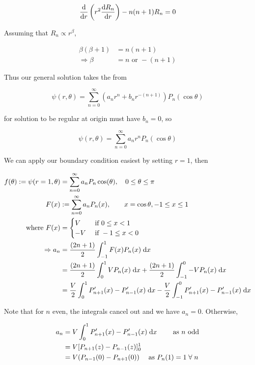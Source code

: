 \documentclass[a4paper]{article}
\begin{document}
\[ \frac{\mathrm{d} }{\mathrm{d} r} \left(  r^{2} \frac{\mathrm{d} R_{n}}{\mathrm{d} r} \right) - n(n+1) R_{n} = 0   \]

Assuming that $ R_{n} \propto r^{\beta} $,

\begin{align*}
\beta (\beta + 1) & = n(n+1) \\
\Rightarrow \beta & = n \text{ or } -(n+1) 
\end{align*}

Thus our general solution takes the from 


\[ \psi (r,\theta) =  \sum_{n=0}^{\infty} (a_{n} r^{n}  + b_{n} r^{-(n+1)}    ) P_{n} (\cos \theta)   \]


for solution to be regular at origin must have $ b_{n} = 0 $, so

\[ \psi (r,\theta) =  \sum_{n=0}^{\infty} a_{n} r^{n} P_{n} (\cos \theta)   \]

We can apply our boundary condition easiest by setting $ r=1 $, then

\begin{align*}
f(\theta) : = \psi(r=1,\theta) & = \sum_{n=0}^{\infty}  a_{n} P_{n} \cos (\theta), \quad 0 \leq \theta \leq \pi  \\
F(x) & : = \sum_{n=0}^{\infty}  a_{n} P_{n} (x), \qquad x = \cos \theta, -1 \leq x \leq 1 \\
\text{where } F(x) & = \begin{cases} V  & \text{ if } 0 \leq x < 1 \\ -V & \text{ if } -1 \leq x < 0 \end{cases} \\
\Rightarrow a_{n} & = \frac{(2n + 1)}{2} \int_{-1}^{1} F(x) P_{n}(x) \; \mathrm{d} x  \\
& = \frac{(2n + 1)}{2} \int_{0}^{1} V P_{n}(x) \; \mathrm{d} x + \frac{(2n + 1)}{2} \int_{-1}^{0} - V P_{n}(x) \; \mathrm{d} x \\
& = \frac{V}{2} \int_{0}^{1} P'_{n+1}(x) - P'_{n-1}(x) \; \mathrm{d} x - \frac{V}{2} \int_{-1}^{0}  P'_{n+1}(x) - P'_{n-1}(x) \; \mathrm{d} x
\end{align*}

Note that for $ n $ even, the integrals cancel out and we have $ a_{n} = 0 $. Otherwise, 

\begin{align*}
a_{n} & = V \int_{0}^{1}   P'_{n+1}(x) - P'_{n-1}(x) \; \mathrm{d} x \qquad \text{ as } n \text{ odd}  \\
& = V [ P_{n+1} (z) - P_{n-1}(z)  ]_{0}^{1} \\
& = V (  P_{n-1}(0) - P_{n+1}(0) ) \quad \text{ as } P_{n}(1) = 1 \; \forall \;  n
\end{align*}
\end{document}
